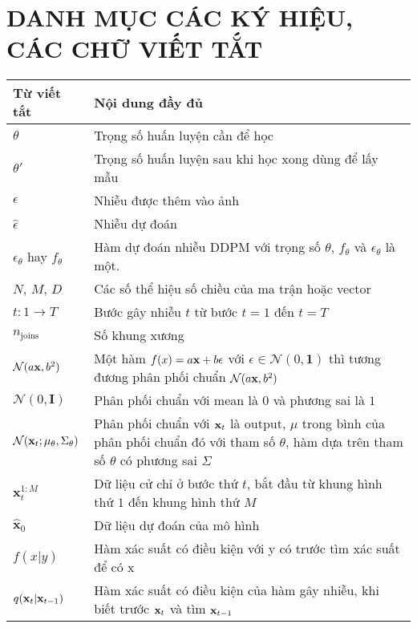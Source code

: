
\pagebreak
{}
{}
\section*{\textbf{ \Large DANH MỤC CÁC KÝ HIỆU, CÁC CHỮ VIẾT TẮT}}

\begin{center}
\begin{tabular}{|p{3cm}|p{11cm}|}
\hline
\textbf{Từ viết tắt} & \textbf{Nội dung đầy đủ} \\
\hline
$\theta$ & Trọng số huấn luyện cần để học \\
\hline
$\theta'$ & Trọng số huấn luyện sau khi học xong dùng để lấy mẫu \\
\hline
$\epsilon$ & Nhiễu được thêm vào ảnh \\
\hline
$\hat{\epsilon}$ & Nhiễu dự đoán\\
\hline
$\epsilon_\theta$ hay $f_\theta$ & Hàm dự đoán nhiễu DDPM với trọng số $\theta$, $f_\theta$ và $\epsilon_\theta$ là một. \\
\hline
$N$, $M$, $D$ & Các số thể hiệu số chiều của ma trận hoặc vector \\
\hline
$t: 1 \rightarrow T$ & Bước gây nhiễu $t$ từ bước $t=1$ đến $t=T$ \\
\hline
$n_{\operatorname{joins}}$ & Số khung xương \\
\hline
$\mathcal{N}(a \mathbf{x}, b^2)$ & Một hàm $f(x) = a \mathbf{x} + b \epsilon$ với $\epsilon \in \mathcal{N}(0, \mathbf{1})$ thì tương đương phân phối chuẩn $\mathcal{N}(a \mathbf{x}, b^2)$ \\
\hline
$\mathcal{N}(0, \mathbf{I})$ & Phân phối chuẩn với mean là $0$ và phương sai là $1$ \\
\hline
$\mathcal{N}(\mathbf{x}_t; \mu_\theta, \Sigma_\theta)$ & Phân phối chuẩn với $\mathbf{x}_t$ là output, $\mu$ trong bình của phân phối chuẩn đó với tham số $\theta$,  hàm dựa trên tham số $\theta$ có phương sai  $\Sigma$ \\ 
\hline
$\mathbf{x}_{t}^{1:M}$ & Dữ liệu cử chỉ ở bước thứ $t$, bắt đầu từ khung hình thứ $1$ đến khung hình thứ $M$ \\
\hline
$\hat{\mathbf{x}}_0$ &  Dữ liệu dự đoán của mô hình \\
\hline
$f(x | y)$ & Hàm xác suất có điều kiện với y có trước tìm xác suất để có x \\
\hline
$q(\mathbf{x}_t | \mathbf{x}_{t-1})$ & Hàm xác suất có điều kiện của hàm gây nhiễu, khi biết trước $\mathbf{x}_t$ và tìm $\mathbf{x}_{t-1}$  \\

\end{tabular}
\end{center}
